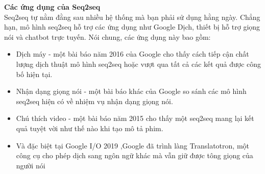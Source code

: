 
\large{\textbf{Các ứng dụng của Seq2seq}} \\[0.2em]
Seq2seq tự nằm đằng sau nhiều hệ thống mà bạn phải sử dụng hằng ngày. Chẳng hạn, mô hình seq2seq hỗ trợ các ứng dụng
như Google Dịch, thiết bị hỗ trợ giọng nói và chatbot trực tuyến. Nói chung, các ứng dụng này bao gồm:

\begin{itemize}
    \item Dịch máy - một bài báo năm 2016 của Google cho thấy cách tiếp cận chất lượng dịch thuật mô hình seq2seq
    hoặc vượt qua tất cả các kết quả được công bố hiện tại.
        {}
    \item Nhận dạng giọng nói - một bài báo khác của Google so sánh các mô hình seq2seq hiện có về nhiệm vụ nhận dạng
    giọng nói.
        {}
    \item Chú thích video - một bài báo năm 2015 cho thấy một seq2seq mang lại kết quả tuyệt vời như thế nào khi tạo
    mô tả phim.
        {}
    \item Và đặc biệt tại Google I/O 2019 ,Google đã trình làng Translatotron, một công cụ cho phép dịch sang ngôn
    ngữ khác mà vẫn giữ được tông giọng của người nói
\end{itemize}

